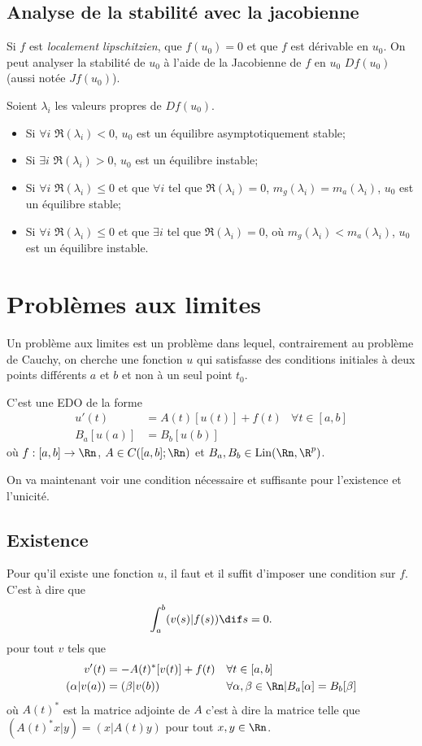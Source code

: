 \subsection{Analyse de la stabilité avec la jacobienne}
Si $f$ est \emph{localement lipschitzien},
que $f(u_0) = 0$ et que $f$ est dérivable
en $u_0$.
On peut analyser la stabilité de $u_0$ à l'aide de la Jacobienne de $f$
en $u_0$ $Df(u_0)$ (aussi notée $Jf(u_0)$).

Soient $\lambda_i$ les valeurs propres de $Df(u_0)$.
\begin{itemize}
  \item Si $\forall i$ $\Re(\lambda_i) < 0$, $u_0$
    est un équilibre asymptotiquement stable;
  \item Si $\exists i$ $\Re(\lambda_i) > 0$, $u_0$
    est un équilibre instable;
  \item Si $\forall i$ $\Re(\lambda_i) \leq 0$ et que $\forall i$ tel que
    $\Re(\lambda_i) = 0$, $m_g(\lambda_i) = m_a(\lambda_i)$,
    $u_0$ est un équilibre stable;
  \item Si $\forall i$ $\Re(\lambda_i) \leq 0$ et que $\exists i$ tel que
    $\Re(\lambda_i) = 0$, où $m_g(\lambda_i) < m_a(\lambda_i)$,
    $u_0$ est un équilibre instable.
\end{itemize}

\section{Problèmes aux limites}
Un problème aux limites est un problème dans lequel,
contrairement au problème de Cauchy,
on cherche une fonction $u$ qui satisfasse des conditions initiales
à deux points différents $a$ et $b$ et non à un seul point $t_0$.

C'est une EDO de la forme
\begin{align*}
  u'(t) & = A(t)[u(t)] + f(t) & \forall t \in [a,b]\\
  B_a[u(a)] & = B_b[u(b)]
\end{align*}
où $f:[a,b]\to\Rn$, $A \in C([a,b];\Rn)$ et $B_a,B_b \in \lin(\Rn,\R^p)$.

On va maintenant voir une condition nécessaire et suffisante pour
l'existence et l'unicité.
\subsection{Existence}
Pour qu'il existe une fonction $u$,
il faut et il suffit d'imposer une condition sur $f$.
C'est à dire que
\[ \int_a^b (v(s)|f(s)) \dif s = 0. \]
pour tout $v$ tels que
\begin{align*}
  v'(t) & = -A(t)^*[v(t)] + f(t) && \forall t \in [a,b]\\
  (\alpha|v(a)) & = (\beta|v(b)) &&
  \forall \alpha,\beta \in \Rn | B_a[\alpha] = B_b[\beta]
\end{align*}
où $A(t)^*$ est la  matrice adjointe de $A$ c'est à dire la matrice telle
que $(A(t)^*x|y) = (x|A(t)y)$ pour tout $x,y \in \Rn$.

